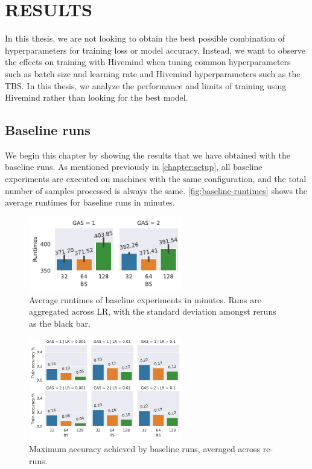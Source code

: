 \chapter{RESULTS}\label{chapter:results}

In this thesis, we are not looking to obtain the best possible combination of hyperparameters for training loss or model accuracy.
Instead, we want to observe the effects on training with Hivemind when tuning common hyperparameters such as batch size and learning rate and Hivemind hyperparameters such as the TBS.
In this thesis, we analyze the performance and limits of training using Hivemind rather than looking for the best model.

\section{Baseline runs}

We begin this chapter by showing the results that we have obtained with the baseline runs.
As mentioned previously in \autoref{chapter:setup}, all baseline experiments are executed on machines with the same configuration, and the total number of samples processed is always the same.
\autoref{fig:baseline-runtimes} shows the average runtimes for baseline runs in minutes.

\begin{figure}[ht]
    \centering
    \includegraphics[width=0.6\textwidth]{./figures/06_barplot-runtime_baseline-16vCPUs-GAS-1.pdf}
    \caption{Average runtimes of baseline experiments in minutes. Runs are aggregated across LR, with the standard deviation amongst reruns as the black bar.}
    \label{fig:baseline-runtimes}
\end{figure}

\begin{figure}[ht]
    \centering
    \includegraphics[width=0.6\textwidth]{./figures/06_barplot-losses_baseline-16vCPUs-GAS-1.pdf}
    \caption{Maximum accuracy achieved by baseline runs, averaged across re-runs.}
    \label{fig:baseline-losses}
\end{figure}

